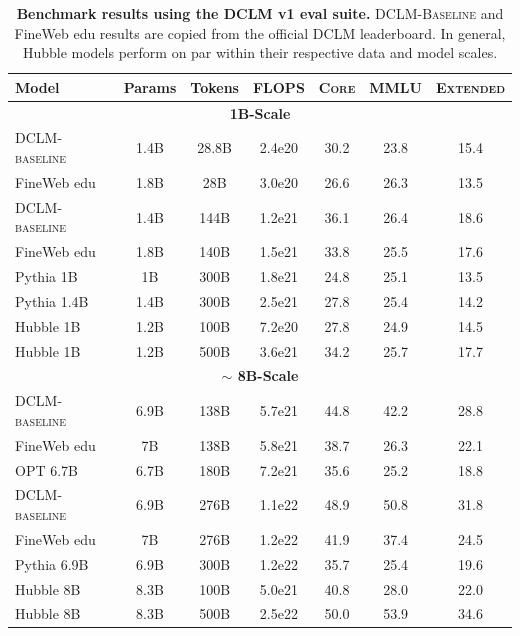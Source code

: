 \documentclass{article} %
\begin{document}
\begin{table}[h]
\centering
\small
\caption{\textbf{Benchmark results using the DCLM v1 eval suite.} \textsc{DCLM-Baseline} and FineWeb edu results are copied from the official DCLM leaderboard. In general, Hubble models perform on par within their respective data and model scales. }
\label{tab:dclm_general_eval}
\begin{tabular}{lcccccc}
\toprule
Model & Params & Tokens & FLOPS & \textsc{Core} & MMLU & \textsc{Extended}\\ 
\midrule 
\multicolumn{7}{c}{\textbf{1B-Scale}} \\
\midrule
\textsc{DCLM-baseline} & 1.4B & 28.8B & 2.4e20 & 30.2 & 23.8 & 15.4 \\
FineWeb edu & 1.8B & 28B & 3.0e20 & 26.6 & 26.3 & 13.5 \\
\textsc{DCLM-baseline} & 1.4B & 144B & 1.2e21 & 36.1 & 26.4 & 18.6 \\
FineWeb edu & 1.8B & 140B & 1.5e21 & 33.8 & 25.5 & 17.6 \\
Pythia 1B & 1B & 300B & 1.8e21 & 24.8 & 25.1 & 13.5 \\
Pythia 1.4B & 1.4B & 300B & 2.5e21 & 27.8 & 25.4 & 14.2 \\
Hubble 1B & 1.2B & 100B & 7.2e20 & 27.8 & 24.9 & 14.5 \\ %
Hubble 1B & 1.2B & 500B & 3.6e21 & 34.2 & 25.7 & 17.7 \\ %

\midrule
\multicolumn{7}{c}{\textbf{$\sim$ 8B-Scale}} \\
\midrule 
\textsc{DCLM-baseline} & 6.9B & 138B & 5.7e21 & 44.8 & 42.2 & 28.8 \\
FineWeb edu & 7B & 138B & 5.8e21 & 38.7 & 26.3 & 22.1 \\
OPT 6.7B & 6.7B & 180B & 7.2e21 & 35.6 & 25.2 & 18.8 \\
\textsc{DCLM-baseline} & 6.9B & 276B & 1.1e22 & 48.9 & 50.8 & 31.8 \\
FineWeb edu & 7B & 276B & 1.2e22 & 41.9 & 37.4 & 24.5 \\
Pythia 6.9B & 6.9B & 300B & 1.2e22 & 35.7 & 25.4 & 19.6 \\
Hubble 8B & 8.3B & 100B & 5.0e21 & 40.8 & 28.0 & 22.0 \\ %
Hubble 8B & 8.3B & 500B & 2.5e22 & 50.0 & 53.9 & 34.6 \\ %

\bottomrule
\end{tabular}
\end{table}
\end{document}
